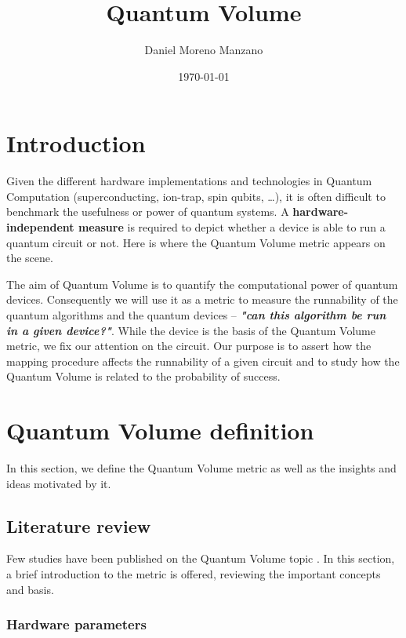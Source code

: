 \documentclass[11pt]{article}
\author{Daniel Moreno Manzano}
\date{\today}
\title{Quantum Volume}
\begin{document}
\maketitle


\section{Introduction}
\label{sec:org977cce4}

Given the different hardware implementations and technologies in Quantum Computation (superconducting, ion-trap, spin qubits, \ldots{}), it is often difficult to benchmark the usefulness or power of quantum systems. 
A \textbf{hardware-independent measure} is required to depict whether a device is able to run a quantum circuit or not.
Here is where the Quantum Volume metric appears on the scene.

The aim of Quantum Volume is to quantify the computational power of quantum devices. 
Consequently we will use it as a metric to measure the runnability of the quantum algorithms and the quantum devices -- \emph{\textbf{"can this algorithm be run in a given device?"}}.
While the device is the basis of the Quantum Volume metric, we fix our attention on the circuit.
Our purpose is to assert how the mapping procedure affects the runnability of a given circuit and to study how the Quantum Volume is related to the probability of success.

\section{Quantum Volume definition}
\label{sec:orgd65f145}

In this section, we define the Quantum Volume metric as well as the insights and ideas motivated by it.

\subsection{Literature review}
\label{sec:org1dd4c1a}

Few studies have been published on the Quantum Volume topic \cite{Bishop_2017,Moll_2018}.
In this section, a brief introduction to the metric is offered, reviewing the important concepts and basis.

\subsubsection{Hardware parameters}
\label{sec:org58baaf4}
\end{document}
